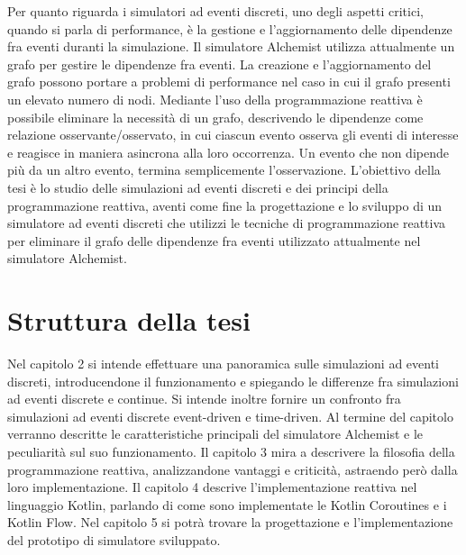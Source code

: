 \documentclass[12pt,a4paper,openright,twoside]{book}
\begin{document}
Per quanto riguarda i simulatori ad eventi discreti, uno degli aspetti critici, quando si parla di performance, è la gestione e l'aggiornamento delle dipendenze fra eventi duranti la simulazione. 
Il simulatore Alchemist utilizza attualmente un grafo per gestire le dipendenze fra eventi. La creazione e l'aggiornamento del grafo possono portare a problemi di performance nel caso in cui il grafo presenti un elevato numero di nodi. 
Mediante l'uso della programmazione reattiva è possibile eliminare la necessità di un grafo, descrivendo le dipendenze come relazione osservante/osservato, in cui ciascun evento osserva gli eventi di interesse e reagisce in maniera asincrona alla loro occorrenza. Un evento che non dipende più da un altro evento, termina semplicemente l'osservazione. 
L'obiettivo della tesi è lo studio delle simulazioni ad eventi discreti e dei principi della programmazione reattiva, aventi come fine la progettazione e lo sviluppo di un simulatore ad eventi discreti che utilizzi le tecniche di programmazione reattiva per eliminare il grafo delle dipendenze fra eventi utilizzato attualmente nel simulatore Alchemist.

\section{Struttura della tesi}
Nel capitolo 2 si intende effettuare una panoramica sulle simulazioni ad eventi discreti, introducendone il funzionamento e spiegando le differenze fra simulazioni ad eventi discrete e continue. Si intende inoltre fornire un confronto fra simulazioni ad eventi discrete event-driven e time-driven. Al termine del capitolo verranno descritte le caratteristiche principali del simulatore Alchemist e le peculiarità sul suo funzionamento. 
Il capitolo 3 mira a descrivere la filosofia della programmazione reattiva, analizzandone vantaggi e criticità, astraendo però dalla loro implementazione. 
Il capitolo 4 descrive l'implementazione reattiva nel linguaggio Kotlin, parlando di come sono implementate le Kotlin Coroutines e i Kotlin Flow. 
Nel capitolo 5 si potrà trovare la progettazione e l'implementazione del prototipo di simulatore sviluppato. 


\end{document}
